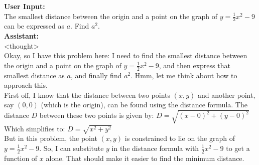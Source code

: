 \begin{abox} 
\textbf{User Input:}  \\
The smallest distance between the origin and a point on the graph of $y=\frac{1}{2}x^2-9$ can be expressed as $a$.  Find $a^2$. \\

\textbf{Assistant:}\\
 <thought>\\
Okay, so I have this problem here: I need to find the smallest distance between the origin and a point on the graph of $ y = \frac{1}{2}x^2 - 9 $, and then express that smallest distance as $ a $, and finally find $ a^2 $. Hmm, let me think about how to approach this.\\

First off, I know that the distance between two points $ (x, y) $ and another point, say $ (0, 0) $ (which is the origin), can be found using the distance formula. The distance $ D $ between these two points is given by:
$ D = \sqrt{(x - 0)^2 + (y - 0)^2} $
Which simplifies to:
$ D = \sqrt{x^2 + y^2} $\\



But in this problem, the point $ (x, y) $ is constrained to lie on the graph of $ y = \frac{1}{2}x^2 - 9 $. So, I can substitute $ y $ in the distance formula with $ \frac{1}{2}x^2 - 9 $ to get a function of $ x $ alone. That should make it easier to find the minimum distance.
\end{abox}
